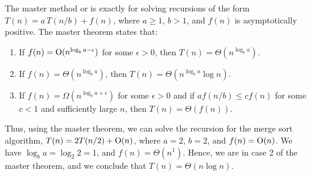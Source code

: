 The master method or  is exactly for solving recursions of the form $T(n) = a\, T(n/b) + f(n)$, where $a \geq 1$, $b > 1$, and $f(n)$ is asymptotically positive. The master theorem states that:
\begin{enumerate}
    \item If $f(n) = \operatorname{O}(n^{\log_{b}a-\epsilon})$ for some $\epsilon > 0$, then $T(n) = \Theta(n^{\log_{b}a})$.
    \item If $f(n) = \Theta(n^{\log_{b}a})$, then $T(n) = \Theta(n^{\log_{b}a}\log n)$.
    \item If $f(n) = \Omega(n^{\log_{b}a+\epsilon})$ for some $\epsilon > 0$ and if $a f(n/b) \leq c f(n)$ for some $c < 1$ and sufficiently large $n$, then $T(n) = \Theta(f(n))$.
\end{enumerate}

Thus, using the master theorem, we can solve the recursion for the merge sort algorithm, $T(n) = 2T(n/2)+\operatorname{O}(n)$, where $a=2$, $b=2$, and $f(n) = \operatorname{O}(n)$. We have $\log_{b}a = \log_{2}2 = 1$, and $f(n) = \Theta(n^{1})$. Hence, we are in case 2 of the master theorem, and we conclude that $T(n) = \Theta(n\log n)$.